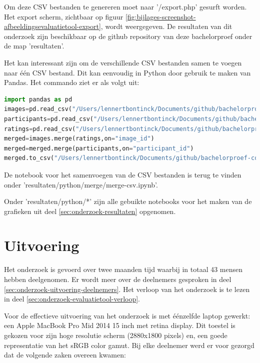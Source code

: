 Om deze CSV bestanden te genereren moet naar '/export.php' gesurft worden. Het export scherm, zichtbaar op figuur \ref{fig:bijlages-screenshot-afbeeldingsevaluatietool-export}, wordt weergegeven. De resultaten van dit onderzoek zijn beschikbaar op de \gls{github} repository van deze bachelorproef onder de map 'resultaten'.

Het kan interessant zijn om de verschillende CSV bestanden samen te voegen naar één CSV bestand. Dit kan eenvoudig in Python door gebruik te maken van Pandas. Het commando ziet er als volgt uit:

\begin{lstlisting}[language=Python]
import pandas as pd
images=pd.read_csv("/Users/lennertbontinck/Documents/github/bachelorproef-compressie/resultaten/csv/images.csv")
participants=pd.read_csv("/Users/lennertbontinck/Documents/github/bachelorproef-compressie/resultaten/csv/participants.csv")
ratings=pd.read_csv("/Users/lennertbontinck/Documents/github/bachelorproef-compressie/resultaten/csv/ratings.csv")
merged=images.merge(ratings,on="image_id")
merged=merged.merge(participants,on="participant_id")
merged.to_csv("/Users/lennertbontinck/Documents/github/bachelorproef-compressie/resultaten/csv/merged.csv", index=False)
\end{lstlisting}

De notebook voor het samenvoegen van de CSV bestanden is terug te vinden onder 'resultaten/python/merge/merge-csv.ipynb'.

Onder 'resultaten/python/*' zijn alle gebuikte notebooks voor het maken van de grafieken uit deel \ref{sec:onderzoek-resultaten} opgenomen.

\section{Uitvoering}
\label{sec:onderzoek-uitvoering}

Het onderzoek is gevoerd over twee maanden tijd waarbij in totaal 43 mensen hebben deelgenomen. Er wordt meer over de deelnemers gesproken in deel \ref{sec:onderzoek-uitvoering-deelnemers}. Het verloop van het onderzoek is te lezen in deel \ref{sec:onderzoek-evaluatietool-verloop}.

Voor de effectieve uitvoering van het onderzoek is met éénzelfde laptop gewerkt: een Apple MacBook Pro Mid 2014 15 inch met retina display. Dit toestel is gekozen voor zijn hoge resolutie scherm (2880x1800 \glspl{pixel}) en, een goede representatie van het  sRGB color gamut. Bij elke deelnemer werd er voor gezorgd dat de volgende zaken overeen kwamen:

